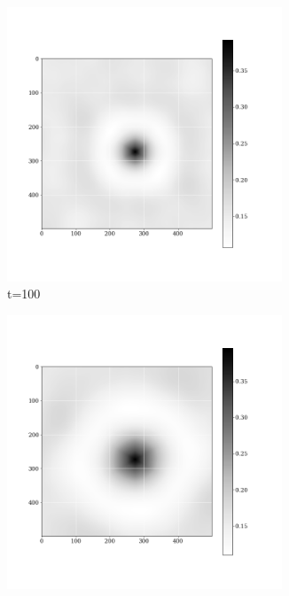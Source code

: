 \documentclass[12pt, a4paper]{report}
\begin{document}
\begin{figure}[H]
\centering
\begin{subfigure}{.32\textwidth}
  \centering
  \includegraphics[width=0.9\textwidth]{Pictures/images9/hexTime/hexa_image_04_100.png}
  \caption{t=100}
  \label{img:microstrImg}
\end{subfigure}
\begin{subfigure}{.32\textwidth}
  \centering
  \includegraphics[width=0.9\textwidth]{Pictures/images9/hexTime/hex_image_04_560.png}

\end{subfigure}
\end{figure}
\end{document}
